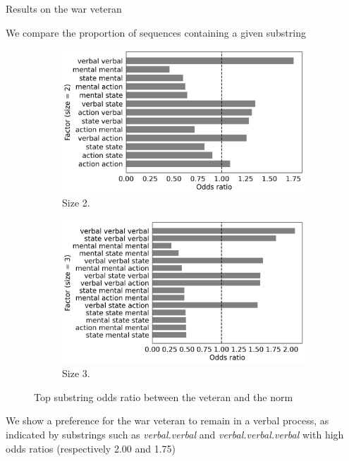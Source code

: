 \documentclass[10pt]{beamer}
\begin{document}
\begin{frame}{Results on the war veteran}

We compare the proportion of sequences containing a given substring

\pause

\begin{figure}[!htb]
     \begin{subfigure}[b]{0.5\textwidth}
         \centering
         \includegraphics[scale=0.2]{img/viet_odds_2.png}
         \caption{Size 2.}
         \label{fig:viet_odds2}
     \end{subfigure}
         \begin{subfigure}[b]{0.4\textwidth}
         \centering
         \includegraphics[scale=0.2]{img/viet_odds_3.png}
         \caption{Size 3.}
         \label{fig:viet_odds3}
     \end{subfigure}
        \caption{Top substring odds ratio between the veteran and the norm}
        \label{fig:viet_odds}
\end{figure}

\pause


We show a preference for the war veteran to remain in a verbal process, as indicated by substrings such as \textit{verbal.verbal} and \textit{verbal.verbal.verbal} with high odds ratios (respectively 2.00 and 1.75)

\end{frame}
\end{document}

